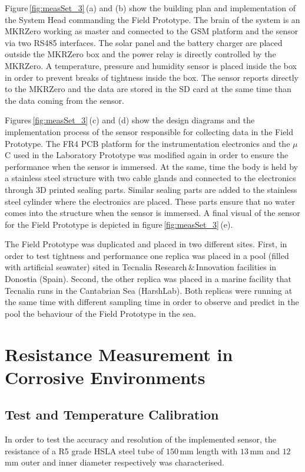 \documentclass[journal,twoside,web]{ieeecolor}
\begin{document}
Figure\,\ref{fig:measSet_3}\,(a) and (b) show the building plan and implementation of the System Head commanding the Field Prototype. The brain of the system is an MKRZero working as master and connected to the GSM platform and the sensor via two RS485 interfaces. The solar panel and the battery charger are placed outside the MKRZero box and the power relay is directly controlled by the MKRZero. A temperature, pressure and humidity sensor is placed inside the box in order to prevent breaks of tightness inside the box. The sensor reports directly to the MKRZero and the data are stored in the SD card at the same time than the data coming from the sensor.

Figures\,\ref{fig:measSet_3}\,(c) and (d) show the design diagrams and the implementation process of the sensor responsible for collecting data in the Field Prototype. The FR4 PCB platform for the instrumentation electronics and the $\mu$C used in the Laboratory Prototype was modified again in order to ensure the performance when the sensor is immersed. At the same, time the body is held by a stainless steel structure with two cable glands and connected to the electronics through 3D printed sealing parts. Similar sealing parts are added to the stainless steel cylinder where the electronics are placed. These parts ensure that no water comes into the structure when the sensor is immersed. A final visual of the sensor for the Field Prototype is depicted in figure\,\ref{fig:measSet_3}\,(e).

The Field Prototype was duplicated and placed in two different sites. First, in order to test tightness and performance one replica was placed in a pool (filled with artificial seawater) sited in Tecnalia Research\,$\&$\,Innovation facilities in Donostia (Spain). Second, the other replica was placed in a marine facility that Tecnalia runs in the Cantabrian Sea (HarshLab). Both replicas were running at the same time with different sampling time in order to observe and predict in the pool the behaviour of the Field Prototype in the sea.
\vspace{0.5cm}
\section{Resistance Measurement in Corrosive Environments}
\label{sec:resMeasCorrEnv}

\subsection{Test and Temperature Calibration}
\label{ssec:tempCalibration}
In order to test the accuracy and resolution of the implemented sensor, the resistance of a R5 grade HSLA steel tube of $150$\,mm length with $13$\,mm and $12$\,mm outer and inner diameter respectively was characterised.
\end{document}
